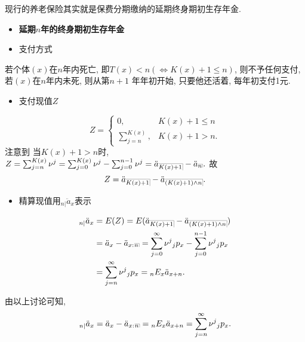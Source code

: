 \documentclass[a4paper,openany, 10pt]{ctexbook}
\makeatletter
\newcommand{\hei}{\CJKfamily{hei}}      %
\DeclareRobustCommand{\annu}[1]{_{%
    \def\arraystretch{0}%
    \setlength\arraycolsep{1pt}%
    \setlength\arrayrulewidth{.2pt}%
    \begin{array}[b]{@{}c|}\hline
        \\[\arraycolsep]%
        \scriptstyle #1%
    \end{array}%
}}
\makeatother
\begin{document}
\begin{remark}
    现行的养老保险其实就是保费分期缴纳的延期终身期初生存年金.
\end{remark}

\begin{itemize}
    \item[{\bf\hei 四.}]{\bf\hei 延期$n$年的终身期初生存年金}
\end{itemize}

\begin{itemize}
    \item[{\bf\hei 1.}] 支付方式
\end{itemize}

若个体$(x)$在$n$年内死亡, 即$T(x)<n(\iff K(x)+1\leq n)$, 则不予任何支付, 若$(x)$在$n$年内未死, 则从第$n+1$ 年年初开始, 只要他还活着, 每年初支付1元.

\begin{itemize}
    \item[{\bf\hei2.}] 支付现值$Z$
\end{itemize}
$$Z =
    \begin{cases}
        0,                 & K(x)+1\leq n \\
        \sum^{K(x)}_{j=n}, & K(x)+1>n.
    \end{cases}
$$
注意到
当$K(x)+1>n$时, $Z=\sum^{K(x)}_{j=n}\nu^{j}=\sum^{K(x)}_{j=0}\nu^{j}-\sum^{n-1}_{j=0}\nu^{j}=\ddot a\annu{K(x)+1}-\ddot a\annu n.$ 故$$Z=\ddot a\annu{K(x)+1}-\ddot a\annu{(K(x)+1)\land n}.$$

\begin{itemize}
    \item[{\bf\hei3.}] 精算现值用$_{n|}\ddot a_{x}$表示
\end{itemize}
\begin{align*}
    _{n|}\ddot a_{x} & =E(Z)=E(\ddot a\annu{K(x)+1}-\ddot a\annu{(K(x)+1)\land n})                                           \\
                     & =\ddot a_{x}-\ddot a_{x:}{}\annu n=\sum^{\infty}_{j=0}\nu^{j}{}_{j}p_{x}-\sum^{n-1}_{j=0}\nu^{j}{}_{j}p_{x} \\
                     & =\sum^{\infty}_{j=n}\nu^{j}{}_{j}p_{x} ={}_{n}E_{x}\ddot a_{x+n}.
\end{align*}

\begin{remark} 由以上讨论可知,
    $$_{n|}\ddot a_{x}=\ddot a_{x}-\ddot a_{x:}{}\annu n={}_{n}E_{x}\ddot a_{x+n}=\sum^{\infty}_{j=n}\nu^{j}{}_{j}p_{x}.$$
\end{remark}
\end{document}

